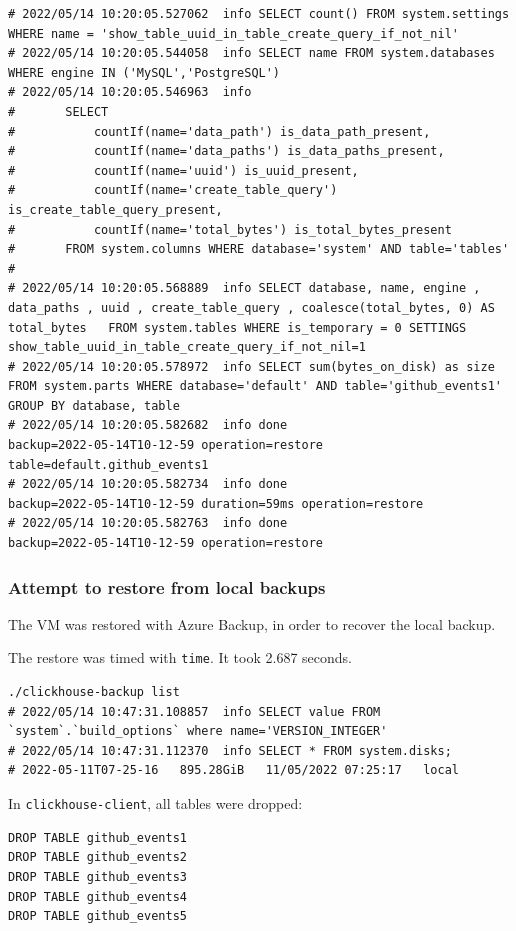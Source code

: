 \begin{verbatim}
# 2022/05/14 10:20:05.527062  info SELECT count() FROM system.settings WHERE name = 'show_table_uuid_in_table_create_query_if_not_nil'
# 2022/05/14 10:20:05.544058  info SELECT name FROM system.databases WHERE engine IN ('MySQL','PostgreSQL')
# 2022/05/14 10:20:05.546963  info
# 		SELECT
# 			countIf(name='data_path') is_data_path_present,
# 			countIf(name='data_paths') is_data_paths_present,
# 			countIf(name='uuid') is_uuid_present,
# 			countIf(name='create_table_query') is_create_table_query_present,
# 			countIf(name='total_bytes') is_total_bytes_present
# 		FROM system.columns WHERE database='system' AND table='tables'
#
# 2022/05/14 10:20:05.568889  info SELECT database, name, engine , data_paths , uuid , create_table_query , coalesce(total_bytes, 0) AS total_bytes   FROM system.tables WHERE is_temporary = 0 SETTINGS show_table_uuid_in_table_create_query_if_not_nil=1
# 2022/05/14 10:20:05.578972  info SELECT sum(bytes_on_disk) as size FROM system.parts WHERE database='default' AND table='github_events1' GROUP BY database, table
# 2022/05/14 10:20:05.582682  info done                      backup=2022-05-14T10-12-59 operation=restore table=default.github_events1
# 2022/05/14 10:20:05.582734  info done                      backup=2022-05-14T10-12-59 duration=59ms operation=restore
# 2022/05/14 10:20:05.582763  info done                      backup=2022-05-14T10-12-59 operation=restore
\end{verbatim}
\subsubsection{Attempt to restore from local backups}
\label{sec:org6d27792}
The VM was restored with Azure Backup, in order to recover the local backup.

The restore was timed with \texttt{time}.
It took 2.687 seconds.

\begin{verbatim}
./clickhouse-backup list
# 2022/05/14 10:47:31.108857  info SELECT value FROM `system`.`build_options` where name='VERSION_INTEGER'
# 2022/05/14 10:47:31.112370  info SELECT * FROM system.disks;
# 2022-05-11T07-25-16   895.28GiB   11/05/2022 07:25:17   local
\end{verbatim}

In \texttt{clickhouse-client}, all tables were dropped:
\begin{verbatim}
DROP TABLE github_events1
DROP TABLE github_events2
DROP TABLE github_events3
DROP TABLE github_events4
DROP TABLE github_events5
\end{verbatim}

